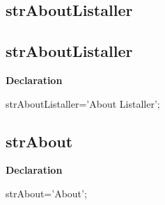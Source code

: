 \documentclass{report}
\newif\ifpdf
\begin{document}
\subsection*{\large{\textbf{strAboutListaller}}\normalsize\hspace{1ex}\hrulefill}
\else
\subsection*{strAboutListaller}
\fi
\label{trstrings-strAboutListaller}
\begin{list}{}{
\setlength{\itemindent}{0cm}
\setlength{\listparindent}{0cm}
\setlength{\leftmargin}{\evensidemargin}
\addtolength{\leftmargin}{\tmplength}
\settowidth{\labelsep}{X}
\addtolength{\leftmargin}{\labelsep}
\setlength{\labelwidth}{\tmplength}
}
\item[\textbf{Declaration}\hfill]
\ifpdf
\begin{flushleft}
\fi
\begin{ttfamily}
strAboutListaller='About Listaller';\end{ttfamily}

\ifpdf
\end{flushleft}
\fi

\end{list}
\ifpdf
\subsection*{\large{\textbf{strAbout}}\normalsize\hspace{1ex}\hrulefill}
\else
\subsection*{strAbout}
\fi
\label{trstrings-strAbout}
\begin{list}{}{
\setlength{\itemindent}{0cm}
\setlength{\listparindent}{0cm}
\setlength{\leftmargin}{\evensidemargin}
\addtolength{\leftmargin}{\tmplength}
\settowidth{\labelsep}{X}
\addtolength{\leftmargin}{\labelsep}
\setlength{\labelwidth}{\tmplength}
}
\item[\textbf{Declaration}\hfill]
\ifpdf
\begin{flushleft}
\fi
\begin{ttfamily}
strAbout='About';\end{ttfamily}

\ifpdf
\end{flushleft}
\fi

\end{list}
\ifpdf
\end{document}
